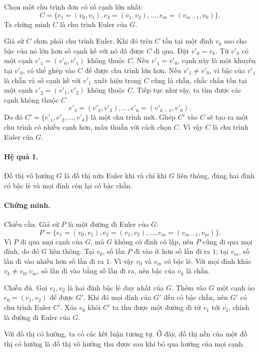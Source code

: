 \documentclass[11pt]{article}
\begin{document}
Chọn một chu trình đơn có số cạnh lớn nhất:
\[
  C=\{e_1=(v_0,v_1), e_2=(v_1,v_2),\ldots,
       e_m=(v_{m-1},v_0)\}.
\]
Ta chứng minh \(C\) là chu trình Euler của \(G\).

Giả sử \(C\) chưa phải chu trình Euler. Khi đó trên \(C\) tồn tại một đỉnh
\(v_k\) sao cho bậc của nó lớn hơn số cạnh kề với nó đã được \(C\) đi qua. Đặt
\(v'_0=v_k\). Từ \(v'_0\) có một cạnh \(e'_1=(v'_0,v'_1)\) không thuộc \(C\).
Nếu \(v'_1=v'_0\), cạnh này là một khuyên tại \(v'_0\), có thể ghép vào \(C\)
để được chu trình lớn hơn. Nếu \(v'_1\ne v'_0\), vì bậc của \(v'_1\) là chẵn
và số cạnh kề với \(v'_1\) xuất hiện trong \(C\) cũng là chẵn, chắc chắn tồn
tại một cạnh \(e'_2=(v'_1,v'_2)\) không thuộc \(C\). Tiếp tục như vậy, ta tìm
được các cạnh không thuộc \(C\)
\[
  e'_3=(v'_2,v'_3),\ldots,e'_k=(v'_{k-1},v'_0).
\]
Do đó \(C'=\{e'_1,e'_2,\ldots,e'_k\}\) là một chu trình mới. Ghép \(C'\) vào
\(C\) sẽ tạo ra một chu trình có nhiều cạnh hơn, mâu thuẫn với cách chọn \(C\).
Vì vậy \(C\) là chu trình Euler của \(G\).

\paragraph{Hệ quả 1.}
Đồ thị vô hướng \(G\) là đồ thị nửa Euler khi và chỉ khi \(G\) liên thông, đúng
hai đỉnh có bậc lẻ và mọi đỉnh còn lại có bậc chẵn.

\paragraph{Chứng minh.}
Chiều cần. Giả sử \(P\) là một đường đi Euler của \(G\):
\[
  P=\{e_1=(v_0,v_1), e_2=(v_1,v_2),\ldots,
       e_m=(v_{m-1},v_m)\}.
\]
Vì \(P\) đi qua mọi cạnh của \(G\), mà \(G\) không có đỉnh cô lập, nên \(P\)
cũng đi qua mọi đỉnh, do đó \(G\) liên thông. Tại \(v_0\), số lần \(P\) đi vào
ít hơn số lần đi ra \(1\); tại \(v_m\), số lần đi vào nhiều hơn số lần đi ra
\(1\). Vì vậy \(v_0\) và \(v_m\) có bậc lẻ. Với mọi đỉnh khác
\(v_k\ne v_0,v_m\), số lần đi vào bằng số lần đi ra, nên bậc của \(v_k\) là
chẵn.

Chiều đủ. Gọi \(v_1,v_2\) là hai đỉnh bậc lẻ duy nhất của \(G\). Thêm vào
\(G\) một cạnh ảo \(e_0=(v_1,v_2)\) để được \(G'\). Khi đó mọi đỉnh của \(G'\)
đều có bậc chẵn, nên \(G'\) có chu trình Euler \(C'\). Xóa \(e_0\) khỏi \(C'\)
ta thu được một đường đi từ \(v_1\) tới \(v_2\), chính là đường đi Euler của
\(G\).

Với đồ thị có hướng, ta có các kết luận tương tự. Ở đây, đồ thị nền của một đồ
thị có hướng là đồ thị vô hướng thu được sau khi bỏ qua hướng của mọi cạnh.
\end{document}
